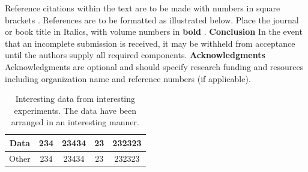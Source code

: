 \documentclass[10pt]{article}
\begin{document}
\begin{multicols}{2}
\noindent
Reference citations within the text are to be made with numbers in square brackets \cite{Wilkinson2018a} \cite{Wilkinson2018b}. References are to be formatted as illustrated below. Place the journal or book title in Italics, with volume numbers in \textbf{bold} \cite{Wilkinson2018a}. \vspace{10pt} \newline
\noindent
\textbf{Conclusion} \vspace{5pt} \newline
In the event that an incomplete submission is received, it may be withheld from acceptance until the authors supply all required components. \vspace{10pt} \newline
\noindent
\textbf{Acknowledgments} \vspace{0.4em} \newline
Acknowledgments are optional and should specify research funding and resources including organization name and reference numbers (if applicable).

\end{multicols}

\begin{table}[h]
    \centering
    \caption{Interesting data from interesting experiments. The data have been arranged in an interesting manner.}
    \begin{tabular}{|c|c|c|c|c|}
    \hline
        Data & 234 & 23434 & 23 & 232323 \\
        \hline
        Other & 234 & 23434 & 23 & 232323 \\
    \hline
    \end{tabular}
    \label{tab:my_label}
\end{table}
\end{document}
